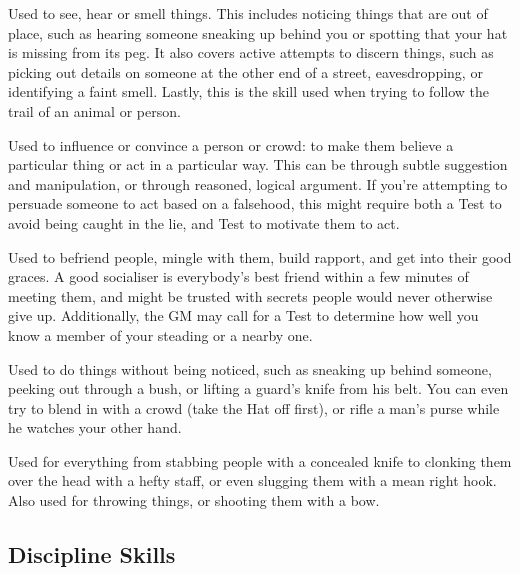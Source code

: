 
Used to see, hear or smell things.
This includes noticing things that are out of place, such as hearing someone sneaking up behind you or spotting that your hat is missing from its peg.
It also covers active attempts to discern things, such as picking out details on someone at the other end of a street, eavesdropping, or identifying a faint smell.
Lastly, this is the skill used when trying to follow the trail of an animal or person.


Used to influence or convince a person or crowd: to make them believe a particular thing or act in a particular way.
This can be through subtle suggestion and manipulation, or through reasoned, logical argument.
If you're attempting to persuade someone to act based on a falsehood, this might require both a  Test to avoid being caught in the lie, and  Test to motivate them to act.


Used to befriend people, mingle with them, build rapport, and get into their good graces.
A good socialiser is everybody's best friend within a few minutes of meeting them, and might be trusted with secrets people would never otherwise give up.
Additionally, the GM may call for a  Test to determine how well you know a member of your steading or a nearby one.


Used to do things without being noticed, such as sneaking up behind someone, peeking out through a bush, or lifting a guard's knife from his belt.
You can even try to blend in with a crowd (take the Hat off first), or rifle a man's purse while he watches your other hand.


Used for everything from stabbing people with a concealed knife to clonking them over the head with a hefty staff, or even slugging them with a mean right hook.
Also used for throwing things, or shooting them with a bow.

\subsection{Discipline Skills}


